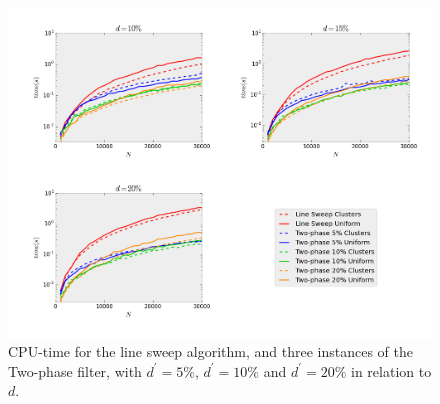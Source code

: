 \begin{figure}[!h] 
	\centering
	\includegraphics[width=0.8\linewidth]{Pictures/ls_bp_t} 
	\caption[CPU-time for Line Sweep and Two-phase filter algorithms.]{CPU-time for the line sweep algorithm, and three instances of the Two-phase filter, with $d^\prime=5\%$, $d^\prime=10\%$ and $d^\prime=20\%$ in relation to $d$.}
	\label{fig:ls_bp_t} 
\end{figure}